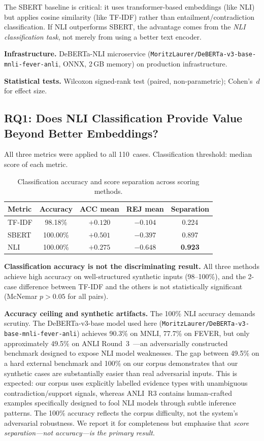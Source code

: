 \documentclass[11pt,a4paper]{article}
\begin{document}
The SBERT baseline is critical: it uses transformer-based embeddings
(like NLI) but applies cosine similarity (like TF-IDF) rather than
entailment/contradiction classification.  If NLI outperforms SBERT,
the advantage comes from the \emph{NLI classification task}, not
merely from using a better text encoder.

\textbf{Infrastructure.}  DeBERTa-NLI microservice
(\texttt{MoritzLaurer/DeBERTa-v3-base-mnli-fever-anli}, ONNX,
2\,GB memory) on production infrastructure.

\textbf{Statistical tests.}  Wilcoxon signed-rank test (paired,
non-parametric); Cohen's~$d$ for effect size.

\subsection{RQ1: Does NLI Classification Provide Value Beyond Better
  Embeddings?}\label{sec:rq1}

All three metrics were applied to all 110~cases.  Classification
threshold: median score of each metric.

\begin{table}[ht]
\centering
\caption{Classification accuracy and score separation across
  scoring methods.}
\label{tab:rq1}
\begin{tabular}{@{}lcccc@{}}
\toprule
\textbf{Metric} & \textbf{Accuracy} & \textbf{ACC mean}
  & \textbf{REJ mean} & \textbf{Separation} \\
\midrule
TF-IDF & 98.18\% & $+0.120$ & $-0.104$ & 0.224 \\
SBERT  & 100.00\% & $+0.501$ & $-0.397$ & 0.897 \\
NLI    & 100.00\% & $+0.275$ & $-0.648$ & \textbf{0.923} \\
\bottomrule
\end{tabular}
\end{table}

\textbf{Classification accuracy is not the discriminating result.}
All three methods achieve high accuracy on well-structured synthetic
inputs (98--100\%), and the 2-case difference between TF-IDF and the
others is not statistically significant (McNemar $p > 0.05$ for all
pairs).

\textbf{Accuracy ceiling and synthetic artifacts.}  The 100\% NLI
accuracy demands scrutiny.  The DeBERTa-v3-base model used here
(\texttt{MoritzLaurer/DeBERTa-v3-base-mnli-fever-anli}) achieves
90.3\% on MNLI, 77.7\% on FEVER, but only approximately 49.5\% on
ANLI Round~3~\cite{nie2020anli}---an adversarially constructed
benchmark designed to expose NLI model weaknesses.  The gap between
49.5\% on a hard external benchmark and 100\% on our corpus
demonstrates that our synthetic cases are substantially easier than
real adversarial inputs.  This is expected: our corpus uses explicitly
labelled evidence types with unambiguous contradiction/support
signals, whereas ANLI~R3 contains human-crafted examples specifically
designed to fool NLI models through subtle inference patterns.  The
100\% accuracy reflects the corpus difficulty, not the system's
adversarial robustness.  We report it for completeness but emphasise
that \emph{score separation---not accuracy---is the primary result}.
\end{document}
